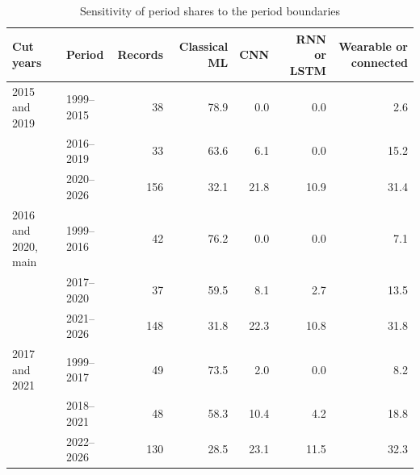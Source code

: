 \begin{table}[!ht]
\caption{Sensitivity of period shares to the period boundaries}
\centering
\footnotesize
\begin{tabular}{@{}llrrrrr@{}}
\toprule
Cut years & Period & Records & Classical ML & CNN & RNN or LSTM & Wearable or connected \\
\midrule
2015 and 2019 & 1999--2015 & 38 & 78.9 & 0.0 & 0.0 & 2.6 \\
 & 2016--2019 & 33 & 63.6 & 6.1 & 0.0 & 15.2 \\
 & 2020--2026 & 156 & 32.1 & 21.8 & 10.9 & 31.4 \\
2016 and 2020, main & 1999--2016 & 42 & 76.2 & 0.0 & 0.0 & 7.1 \\
 & 2017--2020 & 37 & 59.5 & 8.1 & 2.7 & 13.5 \\
 & 2021--2026 & 148 & 31.8 & 22.3 & 10.8 & 31.8 \\
2017 and 2021 & 1999--2017 & 49 & 73.5 & 2.0 & 0.0 & 8.2 \\
 & 2018--2021 & 48 & 58.3 & 10.4 & 4.2 & 18.8 \\
 & 2022--2026 & 130 & 28.5 & 23.1 & 11.5 & 32.3 \\
\bottomrule
\end{tabular}
\end{table}
